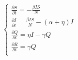 \documentclass[12pt]{article}
\begin{document}
$$\begin{cases}
  \frac{\partial{S}}{\partial{t}} = -\frac{\beta I S}{N} \\
  \frac{\partial{I}}{\partial{t}} = \frac{\beta I S}{N} - (\alpha + \eta)I \\
  \frac{\partial{Q}}{\partial{t}} = \eta I - \gamma Q \\
  \frac{\partial{R}}{\partial{t}} = \gamma Q \\
\end{cases}$$
\end{document}
